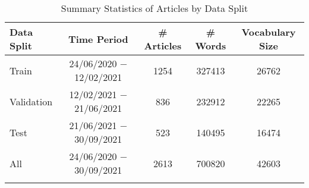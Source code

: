 
\begin{table}[H]
\centering
\caption{Summary Statistics of Articles by Data Split}
\label{tab:Articles_Summary_Statistics}
\begin{tabular}{lcccc}
\hline \Xhline{2\arrayrulewidth}
\textbf{Data Split} & \textbf{Time Period} & \textbf{\# Articles} & \textbf{\# Words} & \textbf{Vocabulary Size} \\
\hline \Xhline{2\arrayrulewidth}
Train & 24/06/2020 $-$ 12/02/2021 & 1254 & 327413 & 26762 \\
Validation & 12/02/2021 $-$ 21/06/2021 & 836 & 232912 & 22265 \\
Test & 21/06/2021 $-$ 30/09/2021 & 523 & 140495 & 16474 \\ \hline \Xhline{\arrayrulewidth}
All & 24/06/2020 $-$ 30/09/2021 & 2613 & 700820 & 42603 \\ \hline \Xhline{2\arrayrulewidth}
\end{tabular}
\mx 
{}
\end{table}
